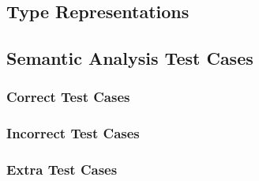 \subsection{Type Representations}
\label{app:semantic/types_doc}



\clearpage

\subsection{Semantic Analysis Test Cases}
\label{app:semantic/testcases}

\subsubsection{Correct Test Cases}
\label{app:semantic/correct}




\clearpage %

\subsubsection{Incorrect Test Cases}
\label{app:semantic/incorrect}



\subsubsection{Extra Test Cases}
\label{app:semantic/extra}


